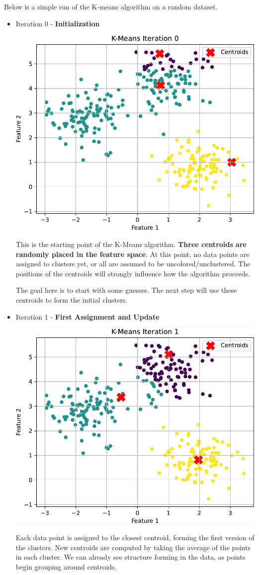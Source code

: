 \begin{examplebox}[: K-Means]
    Below is a simple run of the K-means algorithm on a random dataset.
    \begin{itemize}
        \item Iteration 0 - \textbf{Initialization}
        \begin{center}
            \includegraphics[width=.8\textwidth]{img/k-means/iter_0.pdf}
        \end{center}
        This is the starting point of the K-Means algorithm. \textbf{Three centroids are randomly placed in the feature space}. At this point, no data points are assigned to clusters yet, or all are assumed to be uncolored/unclustered. The positions of the centroids will strongly influence how the algorithm proceeds.

        The goal here is to start with some guesses. The next step will use these centroids to form the initial clusters.


        \item Iteration 1 - \textbf{First Assignment and Update}
        \begin{center}
            \includegraphics[width=.7\textwidth]{img/k-means/iter_1.pdf}
        \end{center}
        Each data point is assigned to the closest centroid, forming the first version of the clusters. New centroids are computed by taking the average of the points in each cluster. We can already see structure forming in the data, as points begin grouping around centroids.


\end{itemize}
\end{examplebox}

